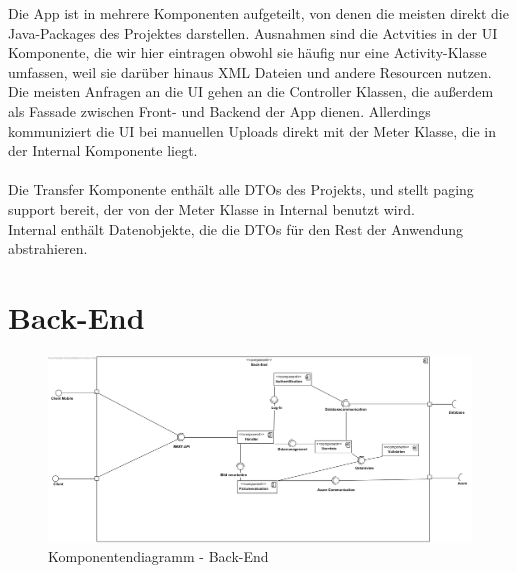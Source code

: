 Die App ist in mehrere Komponenten aufgeteilt, von denen die meisten direkt die Java-Packages des Projektes darstellen. Ausnahmen sind die Actvities in der UI Komponente, die wir hier eintragen obwohl sie häufig nur eine Activity-Klasse umfassen, weil sie darüber hinaus XML Dateien und andere Resourcen nutzen.\\
Die meisten Anfragen an die UI gehen an die Controller Klassen, die außerdem als Fassade zwischen Front- und Backend der App dienen. Allerdings kommuniziert die UI bei manuellen Uploads direkt mit der Meter Klasse, die in der Internal Komponente liegt.\\ \\
Die Transfer Komponente enthält alle DTOs des Projekts, und stellt paging support bereit, der von der Meter Klasse in Internal benutzt wird.\\
Internal enthält Datenobjekte, die die DTOs für den Rest der Anwendung abstrahieren.

\section{Back-End}

\begin{figure}[h]
\includegraphics[width=15cm]{img/diagrams/component-back-end}
\caption{Komponentendiagramm - Back-End} 
\end{figure}


